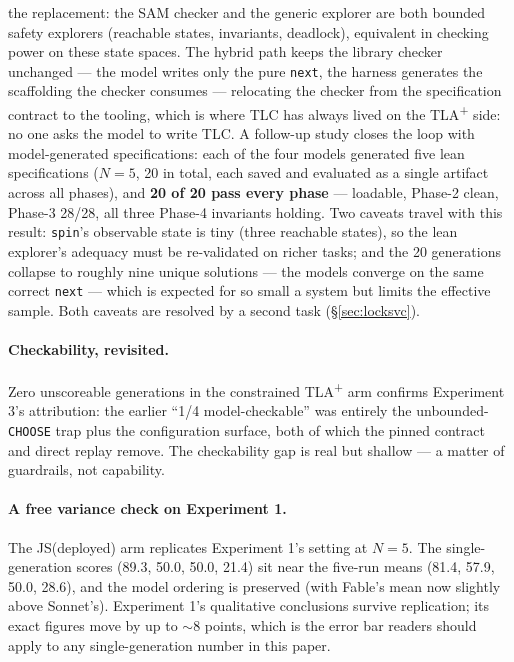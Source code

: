 \documentclass[11pt]{article}
\newcommand{\tlaplus}{TLA\texorpdfstring{\textsuperscript{+}}{+}}
\begin{document}
the replacement: the SAM checker and the generic explorer are both bounded
safety explorers (reachable states, invariants, deadlock), equivalent in
checking power on these state spaces. The hybrid path keeps the library
checker unchanged --- the model writes only the pure \texttt{next}, the
harness generates the scaffolding the checker consumes --- relocating the
checker from the specification contract to the tooling, which is where TLC
has always lived on the \tlaplus{} side: no one asks the model to write
TLC. A follow-up study closes the loop with model-generated
specifications: each of the four models generated five lean specifications
($N{=}5$, 20 in total, each saved and evaluated as a single artifact across
all phases), and \textbf{20 of 20 pass every phase} --- loadable, Phase-2
clean, Phase-3 28/28, all three Phase-4 invariants holding. Two caveats
travel with this result: \texttt{spin}'s observable state is tiny (three
reachable states), so the lean explorer's adequacy must be re-validated on
richer tasks; and the 20 generations collapse to roughly nine unique
solutions --- the models converge on the same correct \texttt{next} ---
which is expected for so small a system but limits the effective sample.
Both caveats are resolved by a second task (\S\ref{sec:locksvc}).

\paragraph{Checkability, revisited.}
Zero unscoreable generations in the constrained \tlaplus{} arm confirms
Experiment 3's attribution: the earlier ``1/4 model-checkable'' was entirely
the unbounded-\texttt{CHOOSE} trap plus the configuration surface, both of
which the pinned contract and direct replay remove. The checkability gap is
real but shallow --- a matter of guardrails, not capability.

\paragraph{A free variance check on Experiment 1.}
The JS(deployed) arm replicates Experiment 1's setting at $N{=}5$. The
single-generation scores (89.3, 50.0, 50.0, 21.4) sit near the five-run means
(81.4, 57.9, 50.0, 28.6), and the model ordering is preserved (with Fable's
mean now slightly above Sonnet's). Experiment 1's qualitative conclusions
survive replication; its exact figures move by up to $\sim$8 points, which is
the error bar readers should apply to any single-generation number in this
paper.
\end{document}
